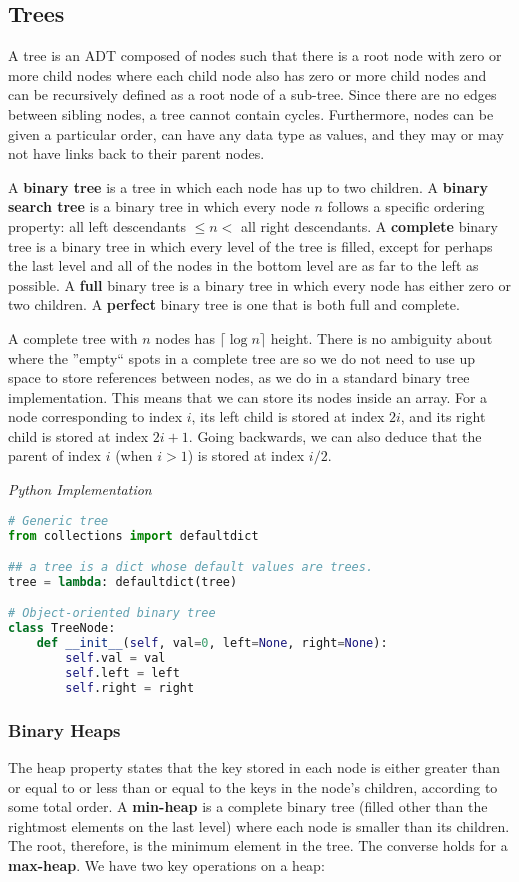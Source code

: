 \documentclass{article}
\begin{document}
    \subsection{Trees}
    A tree is an ADT composed of nodes such that there is a root node with zero or more child nodes where each child node also has zero or more child nodes and can be recursively defined as a root node of a sub-tree. Since there are no edges between sibling nodes, a tree cannot contain cycles. Furthermore, nodes can be given a particular order, can have any data type as values, and they may or may not have links back to their parent nodes.
    
    A \textbf{binary tree} is a tree in which each node has up to two children. A \textbf{binary search tree} is a binary tree in which every node $n$ follows a specific ordering property: all left descendants $\leq n <$ all right descendants. A \textbf{complete} binary tree is a binary tree in which every level of the tree is filled, except for perhaps the last level and all of the nodes in the bottom level are as far to the left as possible. A \textbf{full} binary tree is a binary tree in which every node has either zero or two children. A \textbf{perfect} binary tree is one that is both full and complete.
    
    A complete tree with $n$ nodes has $\lceil \log n \rceil$ height. There is no ambiguity about where the ''empty`` spots in a complete tree are so we do not need to use up space to store references between nodes, as we do in a standard binary tree implementation. This means that we can store its nodes inside an array. For a node corresponding to index $i$, its left child is stored at index $2i$, and its right child is stored at index $2i + 1$. Going backwards, we can also deduce that the parent of index $i$ (when $i > 1$) is stored at index $i/2$.

\vspace{8pt} \emph{Python Implementation}
\begin{lstlisting}[language=Python]
# Generic tree
from collections import defaultdict

## a tree is a dict whose default values are trees. 
tree = lambda: defaultdict(tree)

# Object-oriented binary tree
class TreeNode:
    def __init__(self, val=0, left=None, right=None):
        self.val = val
        self.left = left
        self.right = right
\end{lstlisting}
    
    \subsubsection{Binary Heaps}
    The heap property states that the key stored in each node is either greater than or equal to or less than or equal to the keys in the node's children, according to some total order. A \textbf{min-heap} is a complete binary tree (filled other than the rightmost elements on the last level) where each node is smaller than its children. The root, therefore, is the minimum element in the tree. The converse holds for a \textbf{max-heap}. We have two key operations on a heap: 
    
\end{document}
